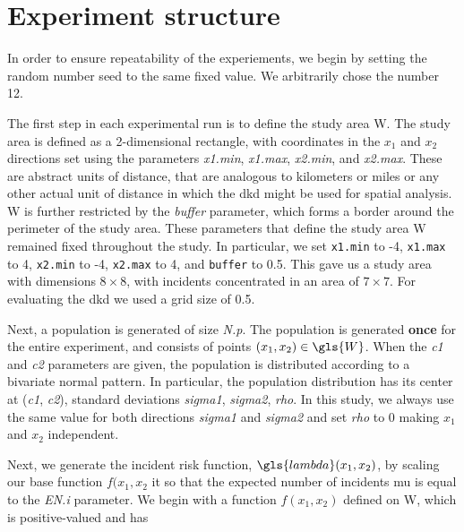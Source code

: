 \section{Experiment structure}
\label{sec:method:experiment_structure}

In order to ensure repeatability of the experiements, we begin by setting the random number seed to the same fixed value.
We arbitrarily chose the number 12.

The first step in each experimental run is to define the study area \gls{W}. 
The study area is defined as a 2-dimensional rectangle, with coordinates in the \(x_1\) and \(x_2\) directions set using the parameters \textit{x1.min}, \textit{x1.max}, \textit{x2.min}, and \textit{x2.max}.
These are abstract units of distance, that are analogous to kilometers or miles or any other actual unit of distance in which the \gls{dkd} might be used for spatial analysis.
\Gls{W} is further restricted by the \textit{buffer} parameter, which forms a border around the perimeter of the study area.
These parameters that define the study area \gls{W} remained fixed throughout the study.
In particular, we set \texttt{x1.min} to -4, \texttt{x1.max} to 4, \texttt{x2.min} to -4, \texttt{x2.max} to 4, and \texttt{buffer} to 0.5.
This gave us a study area with dimensions \(8 \times 8\), with incidents concentrated in an area of \(7 \times 7\).
For evaluating the \gls{dkd} we used a grid size of 0.5.

Next, a population is generated of size \textit{N.p}.
The population is generated \textbf{once} for the entire experiment, and consists of points \((x_1, x_2) \in \gls{W}\).
When the \textit{c1} and \textit{c2} parameters are given, the population is distributed according to a bivariate normal pattern.
In particular, the population distribution has its center at (\textit{c1}, \textit{c2}),
standard deviations \textit{sigma1}, \textit{sigma2}, \textit{rho}.
In this study, we always use the same value for both directions \textit{sigma1} and \textit{sigma2} and set \textit{rho} to 0 making \(x_1\) and \(x_2\) independent.

Next, we generate the incident risk function, \(\gls{lambda}(x_1, x_2)\), by scaling our base function \(f(x_1, x_2\) it so that the expected number of incidents \gls{mu} is equal to the \textit{EN.i} parameter.
We begin with a function \(f(x_1, x_2)\) defined on \gls{W}, which is positive-valued and has 

